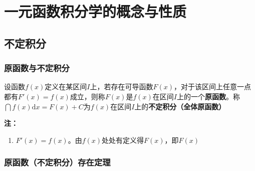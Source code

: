 \documentclass[../book.tex]{subfiles}
\begin{document}
    \section{一元函数积分学的概念与性质}

    \subsection{不定积分}

    \subsubsection{原函数与不定积分}

    设函数$f(x)$定义在某区间$I$上，若存在可导函数$F(x)$，对于该区间上任意一点都有$F'(x) = f(x)$成立，则称$F(x)$是$f(x)$在区间$I$上的一个\textbf{原函数}。称$\dint f(x)\mathrm{d}x = F(x) + C$为$f(x)$在区间$I$上的\textbf{不定积分（全体原函数）}

    \medskip
    \noindent\textbf{注：}
    \begin{enumerate}
        \item $F'(x) = f(x)$。由$f(x)$处处有定义得$F(x)${\color{red}{处处可导}}，即$F(x)${\color{red}{处处连续}}
    \end{enumerate}

    \subsubsection{原函数（不定积分）存在定理}
\end{document}
